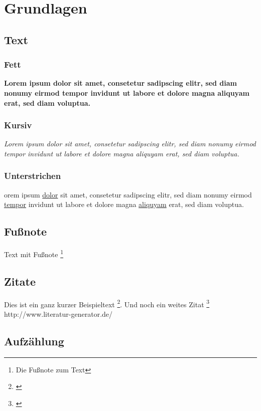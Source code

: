 \documentclass[a4paper,12pt]{article}
\begin{document}
\section{Grundlagen}
\subsection{Text}

\subsubsection{Fett}
\textbf{Lorem ipsum dolor sit amet, consetetur sadipscing elitr, sed diam nonumy eirmod tempor invidunt ut labore et dolore magna aliquyam erat, sed diam voluptua.}

\subsubsection{Kursiv}
\textit{Lorem ipsum dolor sit amet, consetetur sadipscing elitr, sed diam nonumy eirmod tempor invidunt ut labore et dolore magna aliquyam erat, sed diam voluptua.}

\subsubsection{Unterstrichen}
orem ipsum \underline{dolor} sit amet, consetetur sadipscing elitr, sed diam nonumy eirmod \underline{tempor} invidunt ut labore et dolore magna \underline{aliquyam} erat, sed diam voluptua.

\subsection{Fußnote}

Text mit Fußnote \footnote{Die Fußnote zum Text} 

\subsection{Zitate}

Dies ist ein ganz kurzer Beispieltext \footnote{\cite{Baeumle-Courth2004}}. Und noch ein weites Zitat \footnote{\cite{Torvalds2001}}
\\
http://www.literatur-generator.de/

\subsection{Aufzählung}
\end{document}
